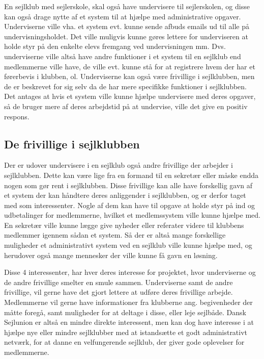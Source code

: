 En sejlklub med sejlerskole, skal også have undervisere til sejlerskolen, og disse kan også drage nytte af et system til
at hjælpe med administrative opgaver. Underviserne ville vha. et system evt. kunne sende afbuds emails ud til alle på
undervisningsholdet. Det ville muligvis kunne gøres lettere for underviseren at holde styr på den enkelte elevs fremgang
ved undervisningen mm. Dvs. underviserne ville altså have andre funktioner i et system til en sejlklub end medlemmerne
ville have, de ville evt. kunne stå for at registrere hvem der har et førerbevis i klubben, ol. Underviserne kan også
være frivillige i sejlklubben, men de er beskrevet for sig selv da de har mere specifikke funktioner i sejlklubben. 
Det antages at hvis et system ville kunne hjælpe undervisere med deres opgaver, så de bruger mere af deres arbejdstid på
at undervise, ville det give en positiv respons.

\subsection{De frivillige i sejlklubben}

Der er udover undervisere i en sejlklub også andre frivillige der arbejder i sejlklubben. Dette kan være lige fra en
formand til en sekretær eller måske endda nogen som gør rent i sejlklubben. Disse frivillige kan alle have forskellig
gavn af et system der kan håndtere deres anliggender i sejlklubben, og er derfor taget med som interessenter. Nogle af
dem kan have til opgave at holde styr på ind og udbetalinger for medlemmerne, hvilket et medlemssystem ville kunne
hjælpe med. En sekretær ville kunne lægge give nyheder eller referater videre til klubbens medlemmer igennem sådan et
system. Så der er altså mange forskellige muligheder et administrativt system ved en sejlklub ville kunne hjælpe med, og
herudover også mange mennesker der ville kunne få gavn en løsning.


Disse 4 interessenter, har hver deres interesse for projektet, hvor underviserne og de andre frivillige smelter en smule
sammen. Underviserne samt de andre frivillige, vil gerne have det gjort lettere at udføre deres frivillige arbejde.
Medlemmerne vil gerne have informationer fra klubberne ang. begivenheder der
måtte foregå, samt muligheder for at deltage i disse, eller leje sejlbåde.
Dansk Sejlunion er altså en mindre direkte interessent, men kan dog have interesse i at hjælpe nye eller mindre
sejlklubber med at istandsætte et godt administrativt netværk, for at danne en velfungerende sejlklub, 
der giver gode oplevelser for medlemmerne.

